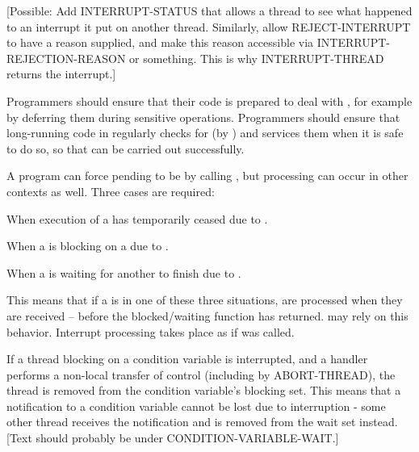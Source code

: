 [Possible: Add INTERRUPT-STATUS that allows a thread to see what happened to
an interrupt it put on another thread. Similarly, allow REJECT-INTERRUPT to
have a reason supplied, and make this reason accessible via
INTERRUPT-REJECTION-REASON or something. This is why INTERRUPT-THREAD returns
the interrupt.]

Programmers should ensure that their code is prepared to deal with
, for example by deferring them during sensitive
operations. Programmers should ensure that long-running code in
 regularly checks for  (by
) and services them when it is safe
to do so, so that  can be carried out successfully.



A program can force pending  to be  by
calling , but 
processing can occur in other contexts as well. Three cases are
required:

\beginlist
\item{\bull} When execution of a  has temporarily ceased
  due to .
\item{\bull} When a  is blocking on a  due to .
\item{\bull} When a  is waiting for another 
  to finish due to .
\endlist
{}

This means that if a  is in one of these three
situations,  are processed when they are received --
before the blocked/waiting function has returned.  may rely on this behavior. Interrupt processing takes
place as if  was called.

If a thread blocking on a condition variable is interrupted, and a handler
performs a non-local transfer of control (including by ABORT-THREAD), the thread
is removed from the condition variable's blocking set. This means that a
notification to a condition variable cannot be lost due to interruption - some
other thread receives the notification and is removed from the wait set instead.
[Text should probably be under CONDITION-VARIABLE-WAIT.]

